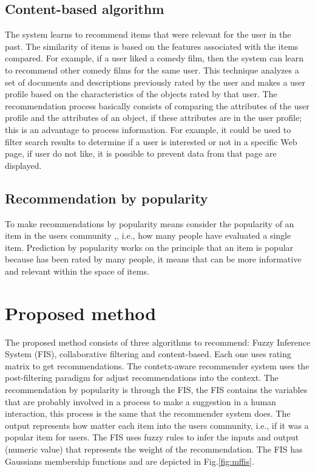   \subsection{Content-based algorithm} \label{sec:2.3}

  The system learns to recommend items that were relevant for the user in the
  past. The similarity of items is based on the features associated with the items
  compared. For example, if a user liked a comedy film, then the system can learn
  to recommend other comedy films for the same user. This technique analyzes a set
  of documents and descriptions previously rated by the user and makes a user
  profile based on the characteristics of the objects rated by that user. The
  recommendation process basically consists of comparing the attributes of the
  user profile and the attributes of an object, if these attributes are in the
  user profile; this is an advantage to process information. For example, it could
  be used to filter search results to determine if a user is interested or not in
  a specific Web page, if user do not like, it is possible to prevent data from
  that page are displayed\cite{ricci2011introduction}.


  \subsection{Recommendation by popularity} \label{sec:2.4}

  To make recommendations by popularity means consider the popularity of an item
  in the users community \cite{shani2008mining},\cite{celma2008new}, i.e., how
  many people have evaluated a single item. Prediction by popularity works on
  the principle that an item is popular because has been rated by many people,
  it means that can be more informative and relevant within the space of items.




\section{Proposed method}\label{sec:3}


The proposed method consists of three algorithms to recommend: Fuzzy Inference
System (FIS), collaborative filtering and content-based.   Each one uses rating
matrix to get recommendations. The contetx-aware recommender system uses the
post-filtering paradigm \cite{adomavicius2011context} for adjust
recommendations into the context. The recommendation by popularity is through
the FIS, the FIS contains the variables that are probably involved in a process
to make a suggestion in a human interaction, this process is the same that the
recommender system does. The output represents how matter each item into the
users community, i.e., if it was a popular item for users. The FIS uses fuzzy
rules to infer the inputs  and output (numeric value) that represents the weight
of the recommendation. The FIS has Gaussians membership functions and are
depicted in Fig.\ref{fig:mffis}.


